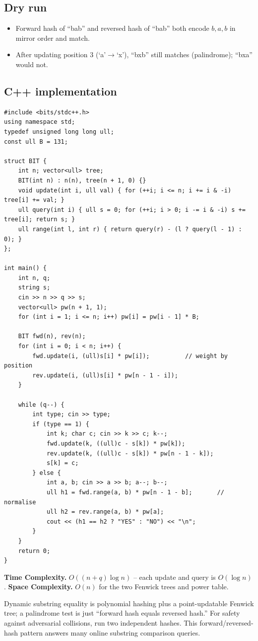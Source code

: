\subsection*{Dry run}


\begin{itemize}
  \item Forward hash of ``bab'' and reversed hash of ``bab'' both encode
        $b,a,b$ in mirror order and match.
  \item After updating position $3$ (`a'$\to$`x'), ``bxb'' still matches
        (palindrome); ``bxa'' would not.
\end{itemize}

\subsection*{C++ implementation}

\begin{lstlisting}
#include <bits/stdc++.h>
using namespace std;
typedef unsigned long long ull;
const ull B = 131;

struct BIT {
    int n; vector<ull> tree;
    BIT(int n) : n(n), tree(n + 1, 0) {}
    void update(int i, ull val) { for (++i; i <= n; i += i & -i) tree[i] += val; }
    ull query(int i) { ull s = 0; for (++i; i > 0; i -= i & -i) s += tree[i]; return s; }
    ull range(int l, int r) { return query(r) - (l ? query(l - 1) : 0); }
};

int main() {
    int n, q;
    string s;
    cin >> n >> q >> s;
    vector<ull> pw(n + 1, 1);
    for (int i = 1; i <= n; i++) pw[i] = pw[i - 1] * B;

    BIT fwd(n), rev(n);
    for (int i = 0; i < n; i++) {
        fwd.update(i, (ull)s[i] * pw[i]);          // weight by position
        rev.update(i, (ull)s[i] * pw[n - 1 - i]);
    }

    while (q--) {
        int type; cin >> type;
        if (type == 1) {
            int k; char c; cin >> k >> c; k--;
            fwd.update(k, ((ull)c - s[k]) * pw[k]);
            rev.update(k, ((ull)c - s[k]) * pw[n - 1 - k]);
            s[k] = c;
        } else {
            int a, b; cin >> a >> b; a--; b--;
            ull h1 = fwd.range(a, b) * pw[n - 1 - b];       // normalise
            ull h2 = rev.range(a, b) * pw[a];
            cout << (h1 == h2 ? "YES" : "NO") << "\n";
        }
    }
    return 0;
}
\end{lstlisting}

\begin{complexitybox}
\textbf{Time Complexity.} $O((n+q)\log n)$ -- each update and query is
$O(\log n)$. \textbf{Space Complexity.} $O(n)$ for the two Fenwick trees
and power table.
\end{complexitybox}

\begin{takeawaybox}
Dynamic substring equality is polynomial hashing plus a point-updatable
Fenwick tree; a palindrome test is just ``forward hash equals reversed
hash.'' For safety against adversarial collisions, run two independent
hashes. This forward/reversed-hash pattern answers many online substring
comparison queries.
\end{takeawaybox}
